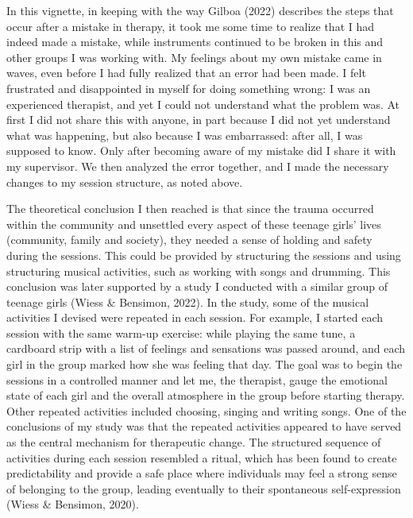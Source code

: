 \documentclass[authordate, empirical, issue]{jote-new-article}
\begin{document}
In this vignette, in keeping with the way Gilboa (2022) describes the steps that occur after a mistake in therapy, it took me some time to realize that I had indeed made a mistake, while instruments continued to be broken in this and other groups I was working with. My feelings about my own mistake came in waves, even before I had fully realized that an error had been made. I felt frustrated and disappointed in myself for doing something wrong: I was an experienced therapist, and yet I could not understand what the problem was. At first I did not share this with anyone, in part because I did not yet understand what was happening, but also because I was embarrassed: after all, I was supposed to know. Only after becoming aware of my mistake did I share it with my supervisor. We then analyzed the error together, and I made the necessary changes to my session structure, as noted above.



The theoretical conclusion I then reached is that since the trauma occurred within the community and unsettled every aspect of these teenage girls' lives (community, family and society), they needed a sense of holding and safety during the sessions. This could be provided by structuring the sessions and using structuring musical activities, such as working with songs and drumming. This conclusion was later supported by a study I conducted with a similar group of teenage girls (Wiess \& Bensimon, 2022). In the study, some of the musical activities I devised were repeated in each session. For example, I started each session with the same warm-up exercise: while playing the same tune, a cardboard strip with a list of feelings and sensations was passed around, and each girl in the group marked how she was feeling that day. The goal was to begin the sessions in a controlled manner and let me, the therapist, gauge the emotional state of each girl and the overall atmosphere in the group before starting therapy. Other repeated activities included choosing, singing and writing songs. One of the conclusions of my study was that the repeated activities appeared to have served as the central mechanism for therapeutic change. The structured sequence of activities during each session resembled a ritual, which has been found to create predictability and provide a safe place where individuals may feel a strong sense of belonging to the group, leading eventually to their spontaneous self-expression (Wiess \& Bensimon, 2020).
\end{document}
